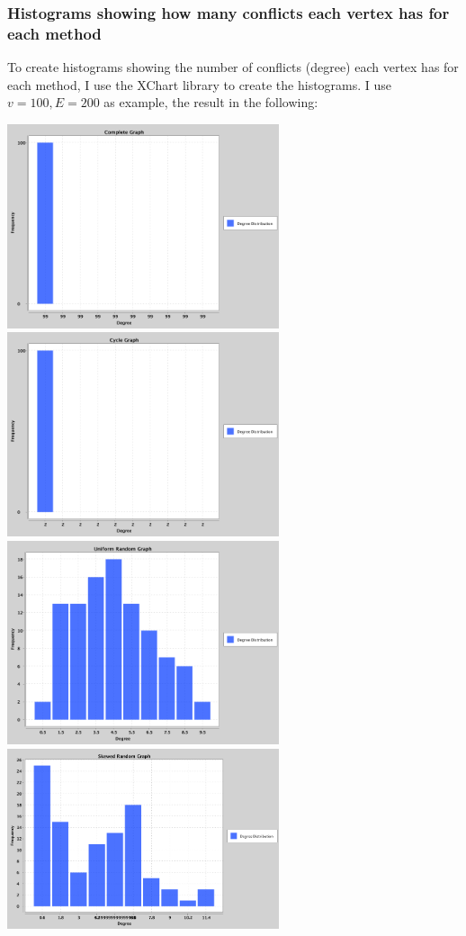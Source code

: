 \documentclass{article}
\begin{document}
\subsubsection{Histograms showing how many conflicts each vertex has for each method}
To create histograms showing the number of conflicts (degree) each vertex has for each method, I use the XChart library to create the histograms. I use $v = 100, E = 200$ as example, the result in the following:
    \begin{center}

        \includegraphics[width=0.6\textwidth]{c2.png}
        \includegraphics[width=0.6\textwidth]{c1.png}
        \includegraphics[width=0.6\textwidth]{c3.png}
        \includegraphics[width=0.6\textwidth]{c4.png}

\end{center}
\end{document}
